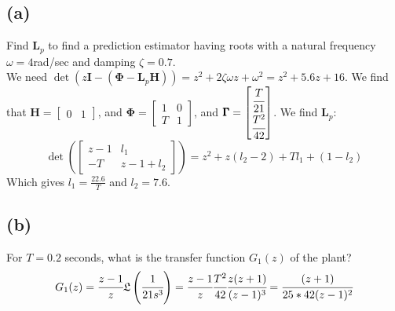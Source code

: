 \documentclass{article}
\begin{document}
\subsection*{(a)}
Find $\pmb{L}_p$ to find a prediction estimator having roots with a natural frequency $\omega=4$rad/sec and damping $\zeta=0.7$.\\
We need $\det(z\pmb{I}-(\pmb{\Phi}-\pmb{L}_p\pmb{H}))=z^2+2\zeta\omega z+\omega^2=z^2+5.6z+16$. We find that $\pmb{H}=\begin{bmatrix}0&1\end{bmatrix}$, and $\pmb{\Phi}=\begin{bmatrix}1&0\\T&1\end{bmatrix}$, and $\pmb{\Gamma}=\begin{bmatrix}\cfrac{T}{21}\\[0.5em]\cfrac{T^2}{42}\end{bmatrix}$. We find $\pmb{L}_p$:
\[\det\left(\begin{bmatrix}z-1&l_1\\-T&z-1+l_2\end{bmatrix}\right)=z^2+z(l_2-2)+Tl_1+(1-l_2)\]
Which gives $l_1=\frac{22.6}{T}$ and $l_2=7.6$.

\subsection*{(b)}
For $T=0.2$ seconds, what is the transfer function $G_1(z)$ of the plant?\\
\[G_1(z)=\cfrac{z-1}{z}\mathfrak{L}\left(\cfrac{1}{21s^3}\right)=\cfrac{z-1}{z}\cfrac{T^2}{42}\cfrac{z(z+1)}{(z-1)^3}=\cfrac{(z+1)}{25*42(z-1)^2}\]
\end{document}
